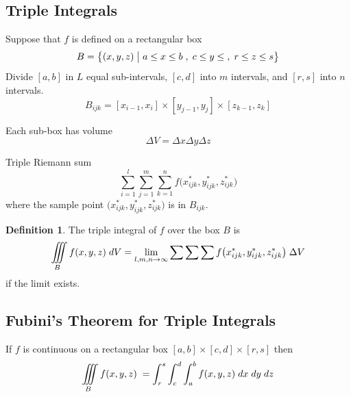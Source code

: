 \documentclass[11pt,a4paper]{article}
\theoremstyle{definition}
\newtheorem{defn}[thm]{Definition}
\begin{document}
{\color[wave]{485}\subsection{Triple Integrals}}
Suppose that $f$ is defined on a rectangular box
$$B = \big\{(x,y,z)\hspace{0.1cm} \big| \hspace{0.1cm} a\leq x \leq b\hspace{0.1cm} , \hspace{0.1cm} c\leq y \leq \hspace{0.1cm} , \hspace{0.1cm} r\leq z \leq s\big\}$$
Divide $[a,b]$ in $L$ equal sub-intervals, $[c,d]$ into $m$ intervals, and $[r,s]$ into $n$ intervals.
$$B_{ijk} = [x_{i-1},x_i]\times [y_{j-1},y_j] \times [z_{k-1},z_k]$$


\begin{figure}[H]
\centering
{}
\end{figure}

Each sub-box has volume $$\Delta V = \Delta x \Delta y \Delta z$$

Triple Riemann sum
$$\sum^l_{i=1} \sum^m_{j=1} \sum^n_{k=1} f\big(x^*_{ijk} , y_{ijk}^*, z^*_{ijk}\big)$$ where the sample point $\big(x^*_{ijk}, y^*_{ijk},z^*_{ijk}\big)$ is in $B_{ijk}$.


\begin{defn}


The triple integral of $f$ over the box $B$ is 
$$\iiint\limits_B f(x,y,z)\hspace{0.1cm}dV = \lim_{l,m,n\rightarrow \infty} \sum \sum \sum f\big(x^*_{ijk} , y_{ijk}^*, z^*_{ijk}\big)\hspace{0.1cm}\Delta V$$ if the limit exists.
\end{defn}


{\color[wave]{485}\subsection{Fubini's Theorem for Triple Integrals}}
If $f$ is continuous on a rectangular box $[a,b]\times [c,d] \times [r,s]$ then 
$$\iiint\limits_B f(x,y,z)\hspace{0.1cm} = \int^s_r\int^d_c\int^b_a f(x,y,z)\hspace{0.1cm}dx \hspace{0.1cm}dy \hspace{0.1cm}dz$$
\end{document}
